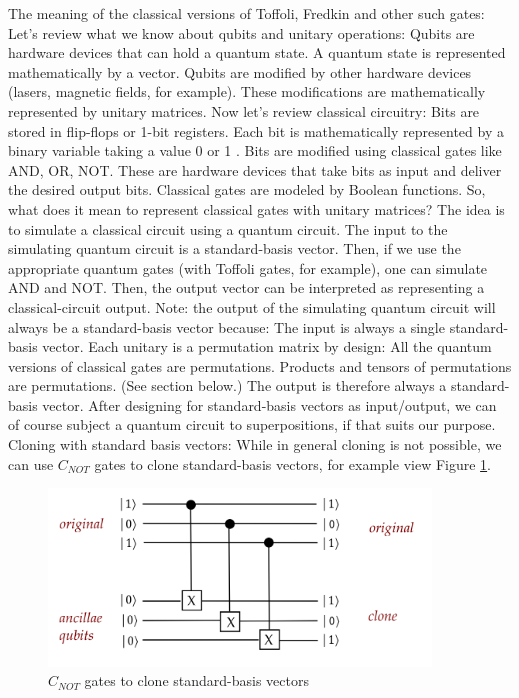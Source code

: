 \documentclass[main.tex]{subfiles}
\begin{document}
    The meaning of the classical versions of Toffoli, Fredkin and other such gates: Let's review what we know about qubits and unitary operations: Qubits are hardware devices that can hold a quantum state. A quantum state is represented mathematically by a vector. Qubits are modified by other hardware devices (lasers, magnetic fields, for example). These modifications are mathematically represented by unitary matrices. Now let's review classical circuitry: Bits are stored in flip-flops or 1-bit registers. Each bit is mathematically represented by a binary variable taking a value 0 or 1 . Bits are modified using classical gates like AND, OR, NOT. These are hardware devices that take bits as input and deliver the desired output bits. Classical gates are modeled by Boolean functions. So, what does it mean to represent classical gates with unitary matrices? The idea is to simulate a classical circuit using a quantum circuit. The input to the simulating quantum circuit is a standard-basis vector. Then, if we use the appropriate quantum gates (with Toffoli gates, for example), one can simulate AND and NOT. Then, the output vector can be interpreted as representing a classical-circuit output. Note: the output of the simulating quantum circuit will always be a standard-basis vector because: The input is always a single standard-basis vector. Each unitary is a permutation matrix by design: All the quantum versions of classical gates are permutations. Products and tensors of permutations are permutations. (See section below.) The output is therefore always a standard-basis vector. After designing for standard-basis vectors as input/output, we can of course subject a quantum circuit to superpositions, if that suits our purpose. Cloning with standard basis vectors: While in general cloning is not possible, we can use $C_{NOT}$ gates to clone standard-basis vectors, for example view Figure \ref{fig:22cloning}.
    
    \begin{figure}
        \centering
        \includegraphics[width=4in]{notes/figs/n10/22cloning.png}
        \caption{$C_{NOT}$ gates to clone standard-basis vectors}
        \label{fig:22cloning}
    \end{figure}
\end{document}
